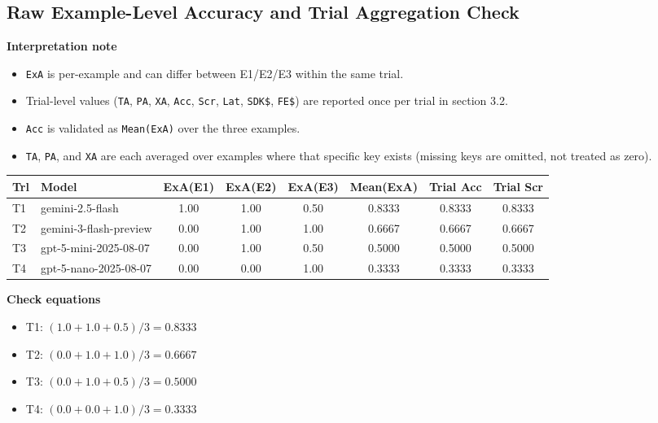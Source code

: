 \documentclass[11pt]{article}
\begin{document}
\subsection{Raw Example-Level Accuracy and Trial Aggregation Check}

\textbf{Interpretation note}
\begin{itemize}
    \item \texttt{ExA} is per-example and can differ between E1/E2/E3 within the same trial.
    \item Trial-level values (\texttt{TA}, \texttt{PA}, \texttt{XA}, \texttt{Acc}, \texttt{Scr}, \texttt{Lat}, \texttt{SDK\$}, \texttt{FE\$}) are reported once per trial in section 3.2.
    \item \texttt{Acc} is validated as \texttt{Mean(ExA)} over the three examples.
    \item \texttt{TA}, \texttt{PA}, and \texttt{XA} are each averaged over examples where that specific key exists (missing keys are omitted, not treated as zero).
\end{itemize}

\begin{table}[H]
\centering
\small
\setlength{\tabcolsep}{4pt}
\begin{tabular}{llcccccc}
\toprule
\textbf{Trl} & \textbf{Model} & \textbf{ExA(E1)} & \textbf{ExA(E2)} & \textbf{ExA(E3)} & \textbf{Mean(ExA)} & \textbf{Trial Acc} & \textbf{Trial Scr} \\
\midrule
T1 & gemini-2.5-flash & 1.00 & 1.00 & 0.50 & 0.8333 & 0.8333 & 0.8333 \\
T2 & gemini-3-flash-preview & 0.00 & 1.00 & 1.00 & 0.6667 & 0.6667 & 0.6667 \\
T3 & gpt-5-mini-2025-08-07 & 0.00 & 1.00 & 0.50 & 0.5000 & 0.5000 & 0.5000 \\
T4 & gpt-5-nano-2025-08-07 & 0.00 & 0.00 & 1.00 & 0.3333 & 0.3333 & 0.3333 \\
\bottomrule
\end{tabular}
\end{table}

\textbf{Check equations}
\begin{itemize}
    \item T1: \((1.0 + 1.0 + 0.5) / 3 = 0.8333\)
    \item T2: \((0.0 + 1.0 + 1.0) / 3 = 0.6667\)
    \item T3: \((0.0 + 1.0 + 0.5) / 3 = 0.5000\)
    \item T4: \((0.0 + 0.0 + 1.0) / 3 = 0.3333\)
\end{itemize}
\end{document}
